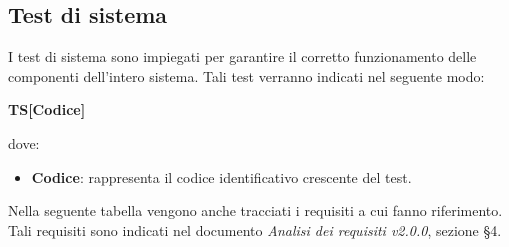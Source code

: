 \subsection{Test di sistema}
I test di sistema sono impiegati per garantire il corretto funzionamento delle componenti dell'intero sistema. Tali test verranno indicati nel seguente modo:\\
	\centerline{\textbf{TS[Codice]}}
dove:
\begin{itemize}
	\item \textbf{Codice}: rappresenta il codice identificativo crescente del test.
\end{itemize}
	Nella seguente tabella vengono anche tracciati i requisiti a cui fanno riferimento. Tali requisiti sono indicati nel documento \textit{Analisi dei requisiti v2.0.0}, sezione §4.

	\renewcommand{\arraystretch}{1.5}
	
